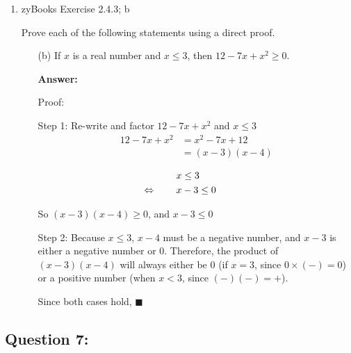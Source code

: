 \documentclass[14pt]{extreport}
\newcommand{\eq}[0]{\llap{\( \Leftrightarrow \) \qquad}}
\newcommand{\answer}[0]{\medskip \textbf{Answer:} \medskip}
\begin{document}
\begin{enumerate}
    \item zyBooks Exercise 2.4.3; b
    
    Prove each of the following statements using a direct proof.
    
        \begin{enumerate}
            
            \item[(b)] If \( x \) is a real number and \( x \leq 3 \), then \( 12 - 7x + x^2 \geq 0 \).
            
                \answer

                Proof:

                Step 1: Re-write and factor \( 12 - 7x + x^2 \) and \( x \leq 3 \)
                \begin{align*}
                    12 - 7x + x^2 &= x^2 - 7x + 12 \\
                                  &= (x - 3)(x -4) \\
                \end{align*}
                \begin{align*}
                    & x \leq 3 \\
                    &\eq x - 3 \leq 0 \\
                \end{align*}

                So \( (x - 3)(x - 4) \geq 0 \), and \( x - 3 \leq 0 \)

                \medskip

                Step 2: Because \( x \leq 3 \), \( x - 4 \) must be a negative number, and \( x - 3 \) is either a negative number or 0. Therefore, the product of \( (x - 3)(x - 4) \) will always either be 0 (if \( x = 3 \), since \( 0 \times (-) = 0 \)) or a positive number (when \( x < 3\), since \( (-)(-) = + \)).

                \medskip 

                Since both cases hold, \( \blacksquare \)
        \end{enumerate}

\end{enumerate}
\newpage

\subsection*{Question 7:}
\end{document}
